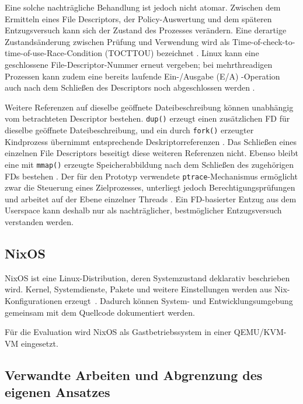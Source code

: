 Eine solche nachträgliche Behandlung ist jedoch nicht atomar. Zwischen dem Ermitteln eines File
Descriptors, der Policy-Auswertung und dem späteren Entzugsversuch kann sich der Zustand des
Prozesses verändern. Eine derartige Zustandsänderung zwischen Prüfung und Verwendung wird als
Time-of-check-to-time-of-use-Race-Condition (TOCTTOU) bezeichnet \citep{mitreCwe367}. Linux kann
eine geschlossene File-Descriptor-Nummer erneut vergeben; bei mehrthreadigen Prozessen kann zudem
eine bereits laufende Ein-/Ausgabe (E/A) -Operation auch nach dem Schließen des Descriptors noch abgeschlossen
werden \citep{manClose}.

Weitere Referenzen auf dieselbe geöffnete Dateibeschreibung können unabhängig vom betrachteten
Descriptor bestehen. \texttt{dup()} erzeugt einen zusätzlichen FD für dieselbe
geöffnete Dateibeschreibung, und ein durch \texttt{fork()} erzeugter Kindprozess übernimmt
entsprechende Deskriptorreferenzen \citep{manDup,manFork}. Das Schließen eines einzelnen File
Descriptors beseitigt diese weiteren Referenzen nicht. Ebenso bleibt eine mit \texttt{mmap()}
erzeugte Speicherabbildung nach dem Schließen des zugehörigen FDs bestehen
\citep{manMmap}. Der für den Prototyp verwendete \texttt{ptrace}-Mechanismus ermöglicht zwar die
Steuerung eines Zielprozesses, unterliegt jedoch Berechtigungsprüfungen und arbeitet auf der Ebene
einzelner Threads \citep{manPtrace}. Ein FD-basierter Entzug aus dem Userspace kann deshalb nur als
nachträglicher, bestmöglicher Entzugsversuch verstanden werden.



\subsection{NixOS}

NixOS ist eine Linux-Distribution, deren Systemzustand deklarativ beschrieben wird.
Kernel, Systemdienste, Pakete und weitere Einstellungen werden aus Nix-Konfigurationen
erzeugt~\citep{nixosManual}. Dadurch können System- und Entwicklungsumgebung gemeinsam mit
dem Quellcode dokumentiert werden.

Für die Evaluation wird NixOS als Gastbetriebssystem in einer QEMU/KVM-VM eingesetzt.

\subsection{Verwandte Arbeiten und Abgrenzung des eigenen Ansatzes}\label{sec:verwandte-arbeiten}

